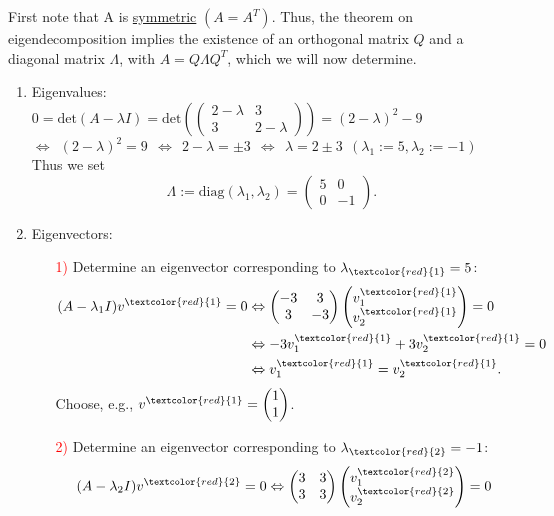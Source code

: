 {\color{solution}
First note that A is \underline{symmetric} $(A=A^T)$. Thus, the theorem on eigendecomposition implies the existence of an orthogonal matrix $Q$ and a diagonal matrix $\Lambda$, with $A=Q\Lambda Q^T$, which we will now determine.
\begin{enumerate}
	\item Eigenvalues:\\
	\hspace*{0.6cm}$0= \text{det}(A-\lambda I) = \text{det}\left(\begin{pmatrix}2-\lambda&3\\3&2-\lambda\end{pmatrix}\right) = (2-\lambda)^2-9$\\
	$\Leftrightarrow~~(2-\lambda)^2 = 9~~ \Leftrightarrow~~2-\lambda = \pm 3~~ \Leftrightarrow~~\lambda = 2\pm 3~~ (\lambda_1:=5, \lambda_2:=-1)$\\
	Thus we set $$\Lambda:=\text{diag}(\lambda_1,\lambda_2)=\begin{pmatrix}5&0\\0&-1\end{pmatrix}.$$
	\item Eigenvectors:
	\begin{enumerate}
		\item[\textcolor{red}{1)}] 
		Determine an eigenvector corresponding to $\lambda_{\textcolor{red}{1}}=5$:
		\begin{align*}
		(A-\lambda_1 I)v^{\textcolor{red}{1}}=0 &\Leftrightarrow \begin{pmatrix}-3&3\\3&-3\end{pmatrix}\begin{pmatrix}v_1^{\textcolor{red}{1}}\\v_2^{\textcolor{red}{1}}\end{pmatrix}=0\\
		&\Leftrightarrow -3v_1^{\textcolor{red}{1}}+3v_2^{\textcolor{red}{1}} =0\\
		&\Leftrightarrow v_1^{\textcolor{red}{1}} = v_2^{\textcolor{red}{1}}.
		\end{align*}
		Choose, e.g., $v^{\textcolor{red}{1}} = \begin{pmatrix}1\\1\end{pmatrix}$.
		\item[\textcolor{red}{2)}] 
		Determine an eigenvector corresponding to $\lambda_{\textcolor{red}{2}}=-1$:
		\begin{align*}
		(A-\lambda_2 I)v^{\textcolor{red}{2}}=0 &\Leftrightarrow \begin{pmatrix}3&3\\3&3\end{pmatrix}\begin{pmatrix}v_1^{\textcolor{red}{2}}\\v_2^{\textcolor{red}{2}}\end{pmatrix}=0\\

\end{align*}
\end{enumerate}
\end{enumerate}}
